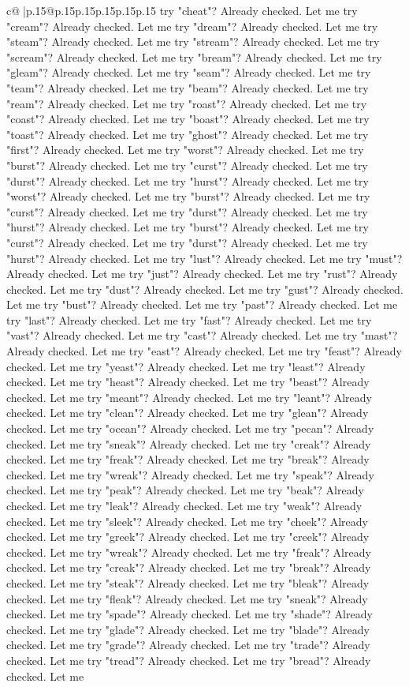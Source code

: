 \documentclass{article}
\begin{document}
{\begin{supertabular}{c@{$\;$}|p{.15\linewidth}@{}p{.15\linewidth}p{.15\linewidth}p{.15\linewidth}p{.15\linewidth}p{.15\linewidth}}
{{{try "cheat"? Already checked. Let me try "cream"? Already checked. Let me try "dream"? Already checked. Let me try "steam"? Already checked. Let me try "stream"? Already checked. Let me try "scream"? Already checked. Let me try "bream"? Already checked. Let me try "gleam"? Already checked. Let me try "seam"? Already checked. Let me try "team"? Already checked. Let me try "beam"? Already checked. Let me try "ream"? Already checked. Let me try "roast"? Already checked. Let me try "coast"? Already checked. Let me try "boast"? Already checked. Let me try "toast"? Already checked. Let me try "ghost"? Already checked. Let me try "first"? Already checked. Let me try "worst"? Already checked. Let me try "burst"? Already checked. Let me try "curst"? Already checked. Let me try "durst"? Already checked. Let me try "hurst"? Already checked. Let me try "worst"? Already checked. Let me try "burst"? Already checked. Let me try "curst"? Already checked. Let me try "durst"? Already checked. Let me try "hurst"? Already checked. Let me try "burst"? Already checked. Let me try "curst"? Already checked. Let me try "durst"? Already checked. Let me try "hurst"? Already checked. Let me try "lust"? Already checked. Let me try "must"? Already checked. Let me try "just"? Already checked. Let me try "rust"? Already checked. Let me try "dust"? Already checked. Let me try "gust"? Already checked. Let me try "bust"? Already checked. Let me try "past"? Already checked. Let me try "last"? Already checked. Let me try "fast"? Already checked. Let me try "vast"? Already checked. Let me try "cast"? Already checked. Let me try "mast"? Already checked. Let me try "east"? Already checked. Let me try "feast"? Already checked. Let me try "yeast"? Already checked. Let me try "least"? Already checked. Let me try "heast"? Already checked. Let me try "beast"? Already checked. Let me try "meant"? Already checked. Let me try "leant"? Already checked. Let me try "clean"? Already checked. Let me try "glean"? Already checked. Let me try "ocean"? Already checked. Let me try "pecan"? Already checked. Let me try "sneak"? Already checked. Let me try "creak"? Already checked. Let me try "freak"? Already checked. Let me try "break"? Already checked. Let me try "wreak"? Already checked. Let me try "speak"? Already checked. Let me try "peak"? Already checked. Let me try "beak"? Already checked. Let me try "leak"? Already checked. Let me try "weak"? Already checked. Let me try "sleek"? Already checked. Let me try "cheek"? Already checked. Let me try "greek"? Already checked. Let me try "creek"? Already checked. Let me try "wreak"? Already checked. Let me try "freak"? Already checked. Let me try "creak"? Already checked. Let me try "break"? Already checked. Let me try "steak"? Already checked. Let me try "bleak"? Already checked. Let me try "fleak"? Already checked. Let me try "sneak"? Already checked. Let me try "spade"? Already checked. Let me try "shade"? Already checked. Let me try "glade"? Already checked. Let me try "blade"? Already checked. Let me try "grade"? Already checked. Let me try "trade"? Already checked. Let me try "tread"? Already checked. Let me try "bread"? Already checked. Let me }}}
\end{supertabular}}
\end{document}
